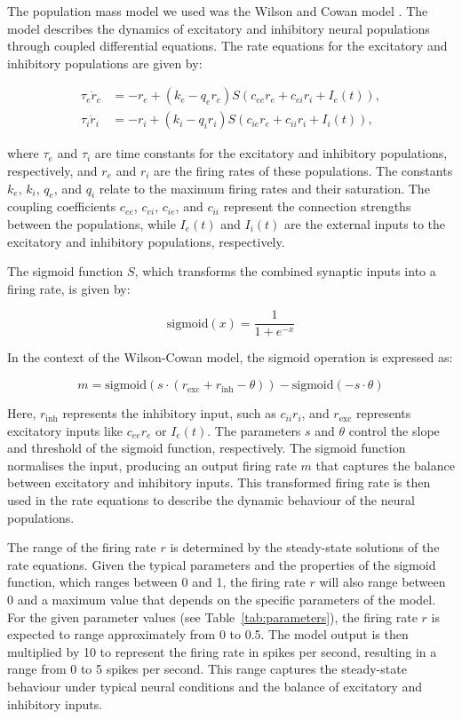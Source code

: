 \documentclass[12pt]{article}
\begin{document}
The population mass model we used was the Wilson and Cowan model \autocite{wilsonExcitatoryInhibitoryInteractions1972}. The model describes the dynamics of excitatory and inhibitory neural populations through coupled differential equations. The rate equations for the excitatory and inhibitory populations are given by:

\[
\begin{aligned}
\tau_e \dot{r}_e &= -r_e + (k_e - q_e r_e) S(c_{ee} r_e + c_{ei} r_i + I_e(t)), \\
\tau_i \dot{r}_i &= -r_i + (k_i - q_i r_i) S(c_{ie} r_e + c_{ii} r_i + I_i(t)),
\end{aligned}
\]

where \( \tau_e \) and \( \tau_i \) are time constants for the excitatory and inhibitory populations, respectively, and \( r_e \) and \( r_i \) are the firing rates of these populations. The constants \( k_e \), \( k_i \), \( q_e \), and \( q_i \) relate to the maximum firing rates and their saturation. The coupling coefficients \( c_{ee} \), \( c_{ei} \), \( c_{ie} \), and \( c_{ii} \) represent the connection strengths between the populations, while \( I_e(t) \) and \( I_i(t) \) are the external inputs to the excitatory and inhibitory populations, respectively.

The sigmoid function \( S \), which transforms the combined synaptic inputs into a firing rate, is given by:

\[
\text{sigmoid}(x) = \frac{1}{1 + e^{-x}}
\]

In the context of the Wilson-Cowan model, the sigmoid operation is expressed as:

\[
m = \text{sigmoid}(s \cdot (r_{\text{exc}} + r_{\text{inh}} - \theta)) - \text{sigmoid}(-s \cdot \theta)
\]

Here, \( r_{\text{inh}} \) represents the inhibitory input, such as \( c_{ii} r_i \), and \( r_{\text{exc}} \) represents excitatory inputs like \( c_{ee} r_e \) or \( I_e(t) \). The parameters \( s \) and \( \theta \) control the slope and threshold of the sigmoid function, respectively. The sigmoid function normalises the input, producing an output firing rate \( m \) that captures the balance between excitatory and inhibitory inputs. This transformed firing rate is then used in the rate equations to describe the dynamic behaviour of the neural populations.

The range of the firing rate \( r \) is determined by the steady-state solutions of the rate equations. Given the typical parameters and the properties of the sigmoid function, which ranges between 0 and 1, the firing rate \( r \) will also range between 0 and a maximum value that depends on the specific parameters of the model. For the given parameter values (see Table~\ref{tab:parameters}), the firing rate \( r \) is expected to range approximately from 0 to 0.5. The model output is then multiplied by 10 to represent the firing rate in spikes per second, resulting in a range from 0 to 5 spikes per second. This range captures the steady-state behaviour under typical neural conditions and the balance of excitatory and inhibitory inputs.
\end{document}
